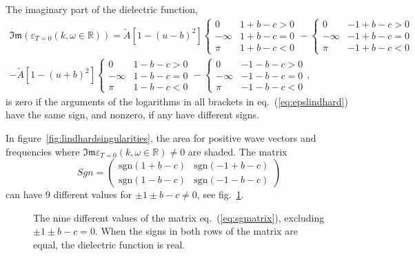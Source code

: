 \documentclass[physics,phd,nolot,nolof]{uccthesis}%
\newcommand{\sgn}{\text{sgn}}
\begin{document}
{The imaginary part of the dielectric function, 
\begin{equation}
    \begin{split}
  \mathfrak{Im}( \varepsilon_{T=0}(k,\omega\in\mathbb{R}))=
  \tilde{A} 
 \left[ 1- (u-b)^2\right]
  \begin{cases}
    0	&	1+b-c >0\\
    -\infty&	1+b-c=0\\
    \pi	&	1+b-c <0
  \end{cases}
  -
  \begin{cases}
    0	&	-1+b-c >0\\
    -\infty&	-1+b-c=0\\
    \pi	&	-1+b-c <0
  \end{cases}%
\\
-\tilde{A}
\left[ 1- (u+b)^2\right]
  \begin{cases}
    0	&	1-b-c >0\\
    -\infty&	1-b-c=0\\
    \pi	&	1-b-c <0
  \end{cases}
  -
  \begin{cases}
    0	&	-1-b-c >0\\
    -\infty&	-1-b-c=0\\
    \pi	&	-1-b-c <0
  \end{cases} ,
\end{split}
\label{eq:im_epslindhard_realw}
\end{equation}
is zero if the arguments of the logarithms in all brackets in eq.~(\ref{eq:epslindhard}) have the same sign,
and nonzero, if any have different signs. 

In figure~\ref{fig:lindhardsingularities}, the area for positive wave vectors and frequencies where $\mathfrak{Im} \varepsilon_{T=0}(k,\omega\in\mathbb{R}) \neq 0$ are shaded.
The matrix 
\begin{equation}
Sgn=  \begin{pmatrix}
  \sgn(1+b-c)	&	\sgn(-1+b-c)\\
  \sgn(1-b-c)	&	\sgn(-1-b-c)
  \end{pmatrix}
  \label{eq:sgmatrix}
\end{equation}
can have 9 different values for $\pm1\pm b-c\neq0$, see fig.~\ref{fig:sgnmatrix}.
\begin{figure}[ht]
  \begin{center}
    
  \end{center}
  \caption{The nine different values of the matrix eq.~(\ref{eq:sgmatrix}), excluding 
  $\pm1 \pm b -c=0$. When the signs in both rows of the matrix are equal, the dielectric 
  function is real.}
  \label{fig:sgnmatrix}
\end{figure}

}
\end{document}
